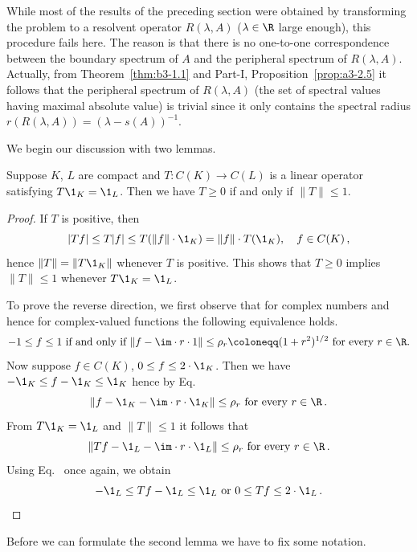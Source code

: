 While most of the results of the preceding section were obtained by transforming the problem to a resolvent operator $R(\lambda,A)$ ($\lambda \in \R$ large enough), this procedure fails here.
The reason is that there is no one-to-one correspondence between the boundary spectrum of\/ $A$ and the peripheral spectrum of\/ $R(\lambda,A)$.
Actually, from Theorem~\ref{thm:b3-1.1} and Part-I, Proposition~\ref{prop:a3-2.5} it follows that the peripheral spectrum of\/ $R(\lambda,A)$ (\ie the set of spectral values having maximal absolute value) is trivial since it only contains the spectral radius $r(R(\lambda,A)) = (\lambda - s(A))^{-1}$.

We begin our discussion with two lemmas.
\begin{lemma}\label{lem:b3-2.1}
	Suppose $K$, $L$ are compact and $T \colon C(K) \to C(L)$ is a linear operator satisfying $T \1_{K} = \1_{L}$.
	Then we have $T \geq 0$ if and only if\/ $\|T\| \leq 1$.
\end{lemma}
\begin{proof}
	If\/ $T$ is positive, then
	\begin{equation}\label{eq:b3-2.1}
	|Tf| \leq T|f| \leq T(\|f\|\cdot \1_{K}) = \|f\|\cdot T(\1_{K}), \quad f \in C(K)\,,
	\end{equation}
	hence $\|T\| = \|T\1_{K}\|$ whenever $T$ is positive.
	This shows that $T \geq 0$ implies $\|T\| \leq 1$ whenever $T\1_{K} = \1_{L}$.
	
	To prove the reverse direction, we first observe that for complex numbers and hence for complex-valued functions the following equivalence holds.
	\begin{equation}\label{eq:b3-2.2}
	-1 \leq f \leq 1 \text{ if and only if } \|f - \im\cdot r\cdot 1\| \leq \rho_{r} \coloneqq (1+r^{2})^{1/2} \text{ for every } r \in \R.
	\end{equation}
	Now suppose $f \in C(K)$, $0 \leq f \leq 2\cdot \1_{K}$.
	Then we have $-\1_{K} \leq f - \1_{K} \leq \1_{K}$ hence by Eq.~ 
    \[\|f - \1_{K} - \im\cdot r\cdot \1_{K}\| \leq \rho_{r}  \text{ for every } r \in \R\,.
    \]
	From $T\1_{K} = \1_{L}$ and $\|T\| \leq 1$ it follows that 
    \[
    \|Tf - \1_{L} - \im\cdot r\cdot \1_{L}\| \leq \rho_{r} \text{ for every } r \in \R\,.
    \]
	Using Eq.~ once again, we obtain 
    \[
    -\1_{L} \leq Tf - \1_{L} \leq \1_{L}\text{ or } 0 \leq Tf \leq 2\cdot \1_{L}\,. \qedhere
    \]
\end{proof}
Before we can formulate the second lemma we have to fix some notation.
